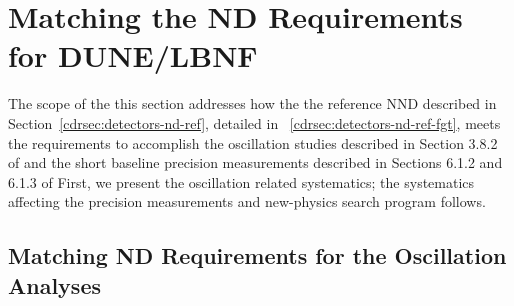 
\section{Matching the ND Requirements for DUNE/LBNF} 
\label{cdrsec:detectors-nd-ref-fgt-req}

The scope of the this section addresses how the the reference NND described in Section~\ref{cdrsec:detectors-nd-ref}, detailed 
in ~\ref{cdrsec:detectors-nd-ref-fgt},  meets the requirements  to accomplish the oscillation studies described in Section 3.8.2 of \volphys %
and the short baseline precision measurements described in Sections 6.1.2 and 6.1.3 of \volphys %
First, we present the oscillation related systematics; 
the systematics affecting the  precision measurements and new-physics search program follows. 


\subsection{Matching ND Requirements for the Oscillation Analyses} 
\label{cdrsec:detectors-nd-ref-fgt-req-oscl}

